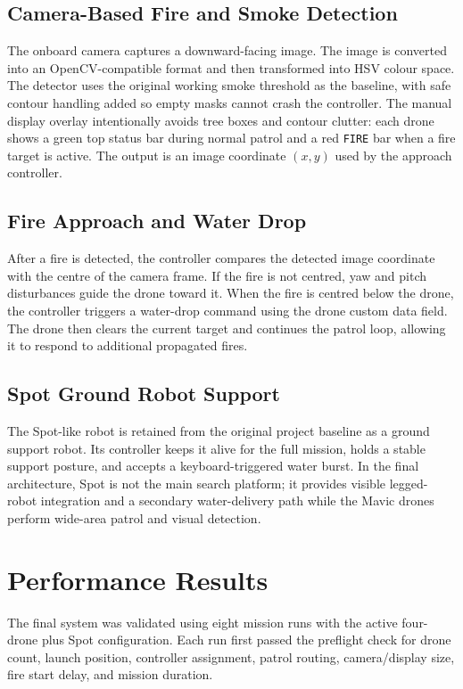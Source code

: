 \documentclass[12pt, a4paper] {report}
\begin{document}
\subsection{Camera-Based Fire and Smoke Detection}
The onboard camera captures a downward-facing image. The image is converted into an OpenCV-compatible format and then transformed into HSV colour space. The detector uses the original working smoke threshold as the baseline, with safe contour handling added so empty masks cannot crash the controller. The manual display overlay intentionally avoids tree boxes and contour clutter: each drone shows a green top status bar during normal patrol and a red \texttt{FIRE} bar when a fire target is active. The output is an image coordinate $(x,y)$ used by the approach controller.

\subsection{Fire Approach and Water Drop}
After a fire is detected, the controller compares the detected image coordinate with the centre of the camera frame. If the fire is not centred, yaw and pitch disturbances guide the drone toward it. When the fire is centred below the drone, the controller triggers a water-drop command using the drone custom data field. The drone then clears the current target and continues the patrol loop, allowing it to respond to additional propagated fires.

\subsection{Spot Ground Robot Support}
The Spot-like robot is retained from the original project baseline as a ground support robot. Its controller keeps it alive for the full mission, holds a stable support posture, and accepts a keyboard-triggered water burst. In the final architecture, Spot is not the main search platform; it provides visible legged-robot integration and a secondary water-delivery path while the Mavic drones perform wide-area patrol and visual detection.

\section{Performance Results}
The final system was validated using eight mission runs with the active four-drone plus Spot configuration. Each run first passed the preflight check for drone count, launch position, controller assignment, patrol routing, camera/display size, fire start delay, and mission duration.
\end{document}
